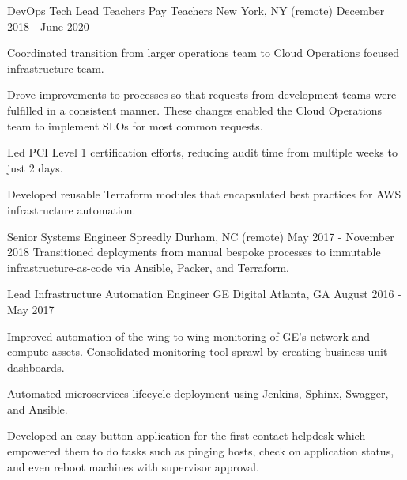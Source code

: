 \begin{cventries}
  \cventry
    {DevOps Tech Lead} %
    {Teachers Pay Teachers} %
    {New York, NY (remote)} %
    {December 2018 - June 2020} %
    {
      \begin{cvitems} %
        \item {Coordinated transition from larger operations team to Cloud Operations focused infrastructure team.}
        \item {Drove improvements to processes so that requests from development teams were fulfilled in a consistent manner. These changes enabled the Cloud Operations team to implement SLOs for most common requests.}
        \item {Led PCI Level 1 certification efforts, reducing audit time from multiple weeks to just 2 days.}
        \item {Developed reusable Terraform modules that encapsulated best practices for AWS infrastructure automation.}
      \end{cvitems}
    }

  \cventry
    {Senior Systems Engineer} %
    {Spreedly} %
    {Durham, NC (remote)} %
    {May 2017 - November 2018} %
    {Transitioned deployments from manual bespoke processes to immutable infrastructure-as-code via Ansible, Packer, and Terraform.}

  \cventry
    {Lead Infrastructure Automation Engineer} %
    {GE Digital} %
    {Atlanta, GA} %
    {August 2016 - May 2017} %
    {
      \begin{cvitems}
        \item {Improved automation of the wing to wing monitoring of GE's network and compute assets. Consolidated monitoring tool sprawl by creating business unit dashboards.}
        \item {Automated microservices lifecycle deployment using Jenkins, Sphinx, Swagger, and Ansible.}
        \item {Developed an easy button application for the first contact helpdesk which empowered them to do tasks such as pinging hosts, check on application status, and even reboot machines with supervisor approval.}
      \end{cvitems}
    }


\end{cventries}
